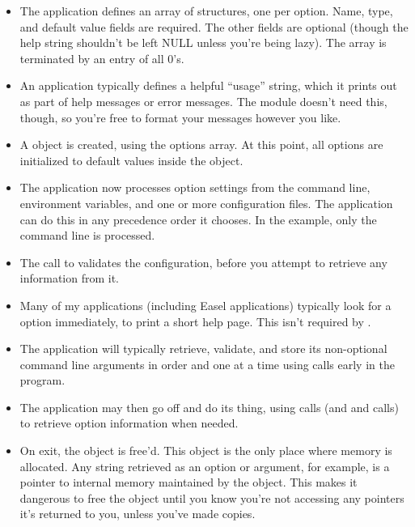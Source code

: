 \begin{itemize}
\item The application defines an array of 
      structures, one per option. Name, type, and default value fields
      are required. The other fields are optional (though the help
      string shouldn't be left NULL unless you're being lazy). The
      array is terminated by an entry of all 0's.

\item An application typically defines a helpful ``usage'' string,
      which it prints out as part of help messages or error messages.
      The  module doesn't need this, though, so you're
      free to format your messages however you like.

\item A  object is created, using the options
      array. At this point, all options are initialized to default
      values inside the object.

\item The application now processes option settings from the command
      line, environment variables, and one or more configuration
      files. The application can do this in any precedence order it
      chooses. In the example, only the command line is processed.
 
\item The call to  validates the
      configuration, before you attempt to retrieve any information
      from it.

\item Many of my applications (including Easel applications) typically
      look for a  option immediately, to print a short help
      page. This isn't required by .

\item The application will typically retrieve, validate, and store its
      non-optional command line arguments in order and one at a time
      using  calls early in the program.
  
\item The application may then go off and do its thing, using
   calls (and  and
   calls) to retrieve option information when
  needed.

\item On exit, the  object is free'd. This 
      object is the only place where memory is allocated. Any string
      retrieved as an option or argument, for example, is a pointer
      to internal memory maintained by the object. This makes it
      dangerous to free the object until you know you're not accessing
      any pointers it's returned to you, unless you've made copies.
\end{itemize}

